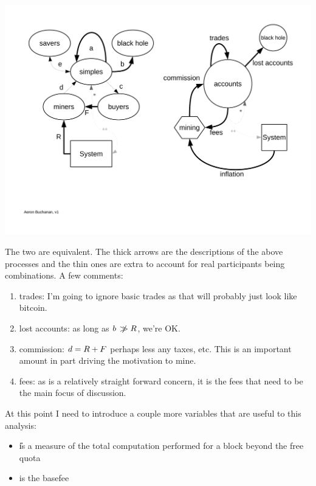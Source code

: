 \documentclass[10pt,a4paper]{article}
\begin{document}
\begin{center}
\includegraphics[trim=1cm 4cm 1cm 1.5cm, clip, width=15cm]{Diagrams/EtherFlow.pdf}
\end{center}

The two are equivalent. The thick arrows are the descriptions of the above processes and the thin ones are extra to account for real participants being combinations. A few comments:
\begin{enumerate}[\hspace{1cm}] \itemsep=0pt
\item trades: I'm going to ignore basic trades as that will probably just look like bitcoin. 
\item lost accounts: as long as $b\ \not\!\gg {\ensuremath{R}}$, we're OK.
\item commission: $d = {R} + F$ perhaps less any taxes, etc. This is an important amount in part driving the motivation to mine.
\item fees: as \R is a relatively straight forward concern, it is the fees that need to be the main focus of discussion.
\end{enumerate}

At this point I need to introduce a couple more variables that are useful to this analysis:
\begin{itemize} \itemsep=0pt
\item \U is a measure of the total computation performed for a block beyond the free quota
\item \x is the basefee
\end{itemize}
\end{document}
